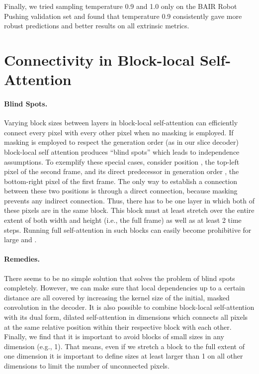 \documentclass{article} \usepackage{iclr2020_conference,times}
\begin{document}
Finally, we tried sampling temperature 0.9 and 1.0 only on the BAIR Robot Pushing validation set and found that temperature 0.9 consistently gave more robust predictions and better results on all extrinsic metrics.

\section{Connectivity in Block-local Self-Attention}\label{sec:independence}

\paragraph{Blind Spots.}
Varying block sizes between layers in block-local self-attention can efficiently connect every pixel with every other pixel when no masking is employed. If masking is employed to respect the generation order (as in our slice decoder) block-local self attention produces ``blind spots'' which leads to independence assumptions. To exemplify these special cases, consider position , the top-left pixel of the second frame, and its direct predecessor in generation order , the bottom-right pixel of the first frame. The only way to establish a connection between these two positions is through a direct connection, because masking prevents any indirect connection. Thus, there has to be one layer in which both of these pixels are in the same block. This block must at least stretch over the entire extent of both width and height (i.e., the full frame) as well as at least 2 time steps. Running full self-attention in such blocks can easily become prohibitive for large  and .

\paragraph{Remedies.}
There seems to be no simple solution that solves the problem of blind spots completely. However, we can make sure that local dependencies up to a certain distance are all covered by increasing the kernel size of the initial, masked convolution in the decoder. It is also possible to combine block-local self-attention with its dual form, dilated self-attention in  dimensions which connects all pixels at the same relative position within their respective block with each other. Finally, we find that it is important to avoid blocks of small sizes in any dimension (e.g., 1). That means, even if we stretch a block to the full extent of one dimension it is important to define sizes at least larger than 1 on all other dimensions to limit the number of unconnected pixels.
\end{document}
